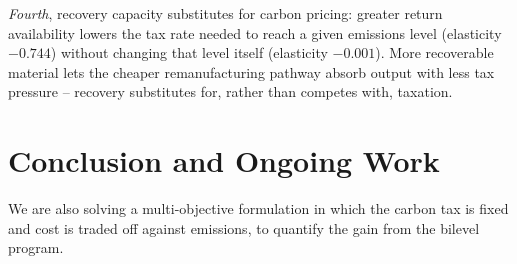 ﻿\documentclass[conference]{IEEEtran}
\begin{document}
\emph{Fourth}, recovery capacity substitutes for carbon pricing:
greater return availability lowers the tax rate needed to reach a
given emissions level (elasticity $-0.744$) without changing that
level itself (elasticity $-0.001$). More recoverable material lets
the cheaper remanufacturing pathway absorb output with less tax
pressure -- recovery substitutes for, rather than competes with,
taxation.

\section{Conclusion and Ongoing Work}
\label{sec:conclusion}

We are also solving a multi-objective formulation in which 
the carbon tax is fixed and cost is traded off against emissions, 
to quantify the gain from the bilevel program.

{\footnotesize


}
\end{document}
